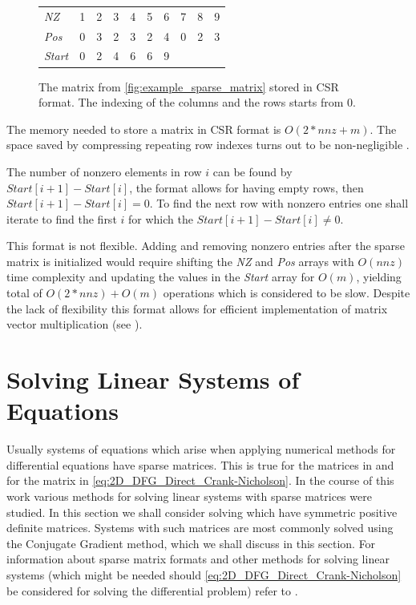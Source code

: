 \begin{figure}[H]
\centering
\begin{tabular}{l|ccccccccc}
\cline{2-10}
\textit{NZ}    & 1 & 2 & 3 & 4 & 5 & 6                      & 7 & 8 & \multicolumn{1}{c|}{9} \\ \cline{2-10}
\textit{Pos}   & 0 & 3 & 2 & 3 & 2 & 4                      & 0 & 2 & \multicolumn{1}{c|}{3} \\ \cline{2-10}
\textit{Start} & 0 & 2 & 4 & 6 & 6 & \multicolumn{1}{c|}{9} &   &   &                        \\ \cline{2-7}
\end{tabular}\caption{The matrix from \cref{fig:example_sparse_matrix} stored in CSR format. The indexing of the columns and the rows starts from 0.}\label{fig:example_csr_sparse_matrix}
\end{figure}

The memory needed to store a matrix in CSR format is $O(2*nnz + m)$. The space saved by compressing repeating row indexes turns out to be non-negligible \cite{saad-sparse}.

The number of nonzero elements in row $i$ can be found by $Start[i+1] - Start[i]$, the format allows for having empty rows, then $Start[i+1] - Start[i] = 0$. To find the next row with nonzero entries one shall iterate to find the first $i$ for which the $Start[i+1] - Start[i] \neq 0$.

This format is not flexible. Adding and removing nonzero entries after the sparse matrix is initialized would require shifting the \textit{NZ} and \textit{Pos} arrays with $O(nnz)$ time complexity and updating the values in the \textit{Start} array for $O(m)$, yielding total of $O(2*nnz) + O(m)$ operations which is considered to be slow. Despite the lack of flexibility this format allows for efficient implementation of matrix vector multiplication (see \cite{saad-sparse}).

\section{Solving Linear Systems of Equations}
Usually systems of equations which arise when applying numerical methods for differential equations have sparse matrices. This is true for the matrices in  and for the matrix in \cref{eq:2D_DFG_Direct_Crank-Nicholson}. In the course of this work various methods for solving linear systems with sparse matrices were studied. In this section we shall consider solving  which have symmetric positive definite matrices. Systems with such matrices are most commonly solved using the Conjugate Gradient method, which we shall discuss in this section. For information about sparse matrix formats and other methods for solving linear systems (which might be needed should \cref{eq:2D_DFG_Direct_Crank-Nicholson} be considered for solving the differential problem) refer to \cite{saad-sparse}.

